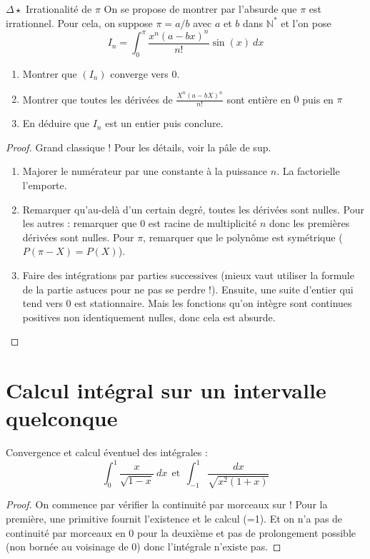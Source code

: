 \documentclass[french,a4paper]{article}
\newcommand{\N}{\mathbb{N}}
\newcommand{\st}{^*}
\theoremstyle{plain}
\theoremstyle{definition}
\theoremstyle{remark}
\begin{document}
\begin{ex}[Moulin.IG.21]{$\Delta\star$ Irrationalité de $\pi$}
	On se propose de montrer par l'absurde que $\pi$ est irrationnel. Pour cela, on suppose $\pi=a/b$ avec $a$ et $b$ dans $\N\st$ et l'on pose $$I_n=\int_{0}^{\pi}\frac{x^n(a-bx)^n}{n!}\sin(x)\ dx$$
	\begin{enumerate}
		\item Montrer que $(I_n)$ converge vers $0$.
		\item Montrer que toutes les dérivées de $\displaystyle \frac{X^n(a-bX)^n}{n!}$ sont entière en $0$ puis en $\pi$
		\item En déduire que $I_n$ est un entier puis conclure.
	\end{enumerate}
\end{ex}

\begin{proof}
	Grand classique ! Pour les détails, voir la pâle de sup.
	\begin{enumerate}
		\item Majorer le numérateur par une constante à la puissance $n$. La factorielle l'emporte.
		\item Remarquer qu'au-delà d'un certain degré, toutes les dérivées sont nulles. Pour les autres : remarquer que $0$ est racine de multiplicité $n$ donc les premières dérivées sont nulles. Pour $\pi$, remarquer que le polynôme est symétrique ($P(\pi-X)=P(X)$).
		\item Faire des intégrations par parties successives (mieux vaut utiliser la formule de la partie astuces pour ne pas se perdre !). Ensuite, une suite d'entier qui tend vers $0$ est stationnaire. Mais les fonctions qu'on intègre sont continues positives non identiquement nulles, donc cela est absurde.
	\end{enumerate}
\end{proof}

\section{Calcul intégral sur un intervalle quelconque}

\begin{ex}[Moulin.IG.22]{}
	Convergence et calcul éventuel des intégrales : $$\int_{0}^{1}\frac{x}{\sqrt{1-x}}\ dx \ \ \text{et} \ \ \int_{-1}^{1}\frac{dx}{\sqrt{x^2(1+x)}}$$
\end{ex}
\begin{proof}
	On commence par vérifier la continuité par morceaux sur ! Pour la première, une primitive fournit l'existence et le calcul (=1). Et on n'a pas de continuité par morceaux en $0$ pour la deuxième et pas de prolongement possible (non bornée au voisinage de $0$) donc l'intégrale n'existe pas.
\end{proof}
\end{document}
